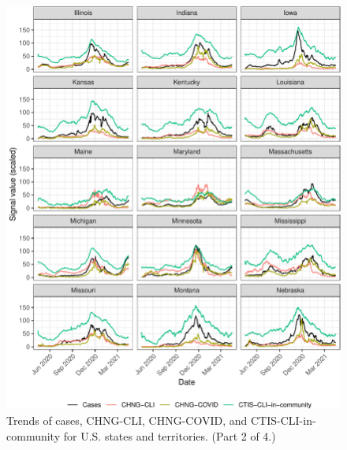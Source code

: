 \documentclass[9pt,twoside]{pnas-new}
\begin{document}
\begin{figure}

{\centering \includegraphics[width=\textwidth]{fig/state-trend-grids-2-1} 

}

\caption{Trends of cases, CHNG-CLI, CHNG-COVID, and CTIS-CLI-in-community for U.S. states and territories. (Part 2 of 4.)}\label{fig:state-trend-grids-2}
\end{figure}

\clearpage
\end{document}
